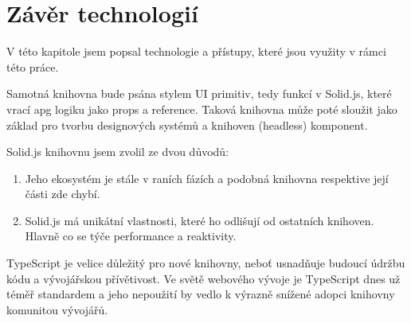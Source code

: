 \clearpage

\section{Závěr technologií}

V této kapitole jsem popsal technologie a přístupy, které jsou využity v rámci této práce.

Samotná knihovna bude psána stylem UI primitiv, tedy funkcí v Solid.js, které vrací \gls{apg} logiku jako props a reference.
Taková knihovna může poté sloužit jako základ pro tvorbu designových systémů a knihoven (headless) komponent.

Solid.js knihovnu jsem zvolil ze dvou důvodů:

\begin{enumerate}
      \item Jeho ekosystém je stále v raních fázích a podobná knihovna respektive její části zde chybí.
      \item Solid.js má unikátní vlastnosti, které ho odlišují od ostatních knihoven. Hlavně co se týče performance a reaktivity.
\end{enumerate}

TypeScript je velice důležitý pro nové knihovny, neboť usnadňuje budoucí údržbu kódu a vývojářskou přívětivost.
Ve světě webového vývoje je TypeScript dnes už téměř standardem a jeho nepoužití by vedlo k výrazně snížené adopci knihovny komunitou vývojářů.

